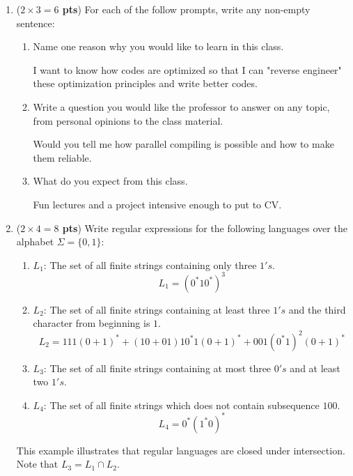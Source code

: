 \documentclass[10pt]{article}
\newcommand {\pts}[1]{({\bf #1 pts})}
\begin{document}
\begin{enumerate}
  \item \pts{$2\times 3=6$} For each of the follow prompts, write any non-empty sentence:
  \begin{enumerate}
		   \item Name one reason why you would like to learn in this class.

			I want to know how codes are optimized so that I can "reverse engineer" these optimization principles and write better codes.

		   \item Write a question you would like the professor to answer on any topic, from personal opinions to the class material.

		   Would you tell me how parallel compiling is possible and how to make them reliable.

		   \item What do you expect from this class.

		   Fun lectures and a project intensive enough to put to CV.

  \end{enumerate}
  \item \pts{$2\times 4=8$} Write regular expressions for the following languages over the alphabet $\Sigma=\{0,1\}$:
 \begin{enumerate}
		   \item $L_1$: The set of all finite strings containing only three $1's$.
			\[
			L_1 = (0^*10^*)^3
			\]
		   \item $L_2$: The set of all finite strings containing at least three $1's$ and the third character from beginning is $1$.
			\[
		   L_2 = 111(0+1)^* + (10+01)10^*1(0+1)^* + 001(0^*1)^2(0+1)^*
			\]
		   \item $L_3$: The set of all finite strings containing at most three $0's$ and at least two $1's$.
			\[
			\]
		   \item $L_4$: The set of all finite strings which does not contain subsequence $100$.
			\[
			L_4 = 0^*(1^*0)^*
			\]
   \end{enumerate}
   This example illustrates that regular languages are closed under intersection. Note that
   $L_3=L_1\cap L_2$.


\end{enumerate}
\end{document}
